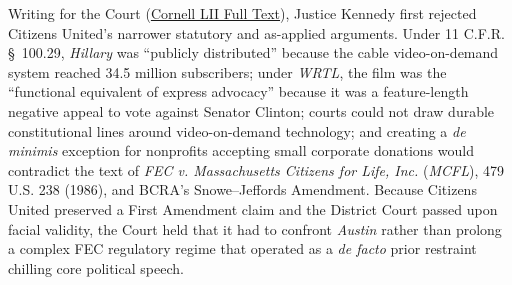 \documentclass[12pt]{article}
\begin{document}
Writing for the Court (\href{https://www.law.cornell.edu/supct/html/08-205.ZO.html}{Cornell LII Full Text}), Justice Kennedy first rejected Citizens United's narrower statutory and as-applied arguments. Under 11 C.F.R. \S~100.29, \textit{Hillary} was ``publicly distributed'' because the cable video-on-demand system reached 34.5 million subscribers; under \textit{WRTL}, the film was the ``functional equivalent of express advocacy'' because it was a feature-length negative appeal to vote against Senator Clinton; courts could not draw durable constitutional lines around video-on-demand technology; and creating a \textit{de minimis} exception for nonprofits accepting small corporate donations would contradict the text of \textit{FEC v. Massachusetts Citizens for Life, Inc.} (\textit{MCFL}), 479 U.S. 238 (1986), and BCRA's Snowe--Jeffords Amendment. Because Citizens United preserved a First Amendment claim and the District Court passed upon facial validity, the Court held that it had to confront \textit{Austin} rather than prolong a complex FEC regulatory regime that operated as a \textit{de facto} prior restraint chilling core political speech.
\end{document}
